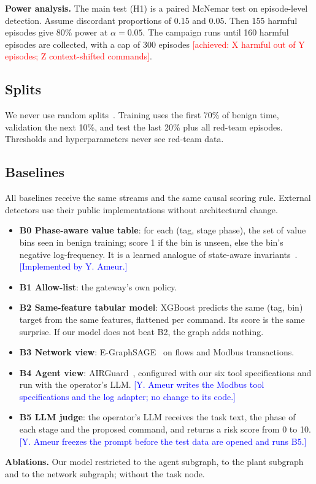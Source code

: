 \documentclass[journal]{IEEEtran}
\newcommand{\billal}[1]{\textcolor{red}{#1}}
\newcommand{\yulliwas}[1]{\textcolor{blue}{#1}}
\begin{document}
\textbf{Power analysis.} The main test (H1) is a paired McNemar test on episode-level detection. Assume discordant proportions of 0.15 and 0.05. Then 155 harmful episodes give 80\% power at $\alpha=0.05$. The campaign runs until 160 harmful episodes are collected, with a cap of 300 episodes \billal{[achieved: X harmful out of Y episodes; Z context-shifted commands]}.

\subsection{Splits}
We never use random splits~\cite{zavrak2026content}. Training uses the first 70\% of benign time, validation the next 10\%, and test the last 20\% plus all red-team episodes. Thresholds and hyperparameters never see red-team data.

\subsection{Baselines}
All baselines receive the same streams and the same causal scoring rule. External detectors use their public implementations without architectural change.
\begin{itemize}
\item \textbf{B0 Phase-aware value table}: for each (tag, stage phase), the set of value bins seen in benign training; score 1 if the bin is unseen, else the bin's negative log-frequency. It is a learned analogue of state-aware invariants~\cite{abbas2024sain}. \yulliwas{[Implemented by Y. Ameur.]}
\item \textbf{B1 Allow-list}: the gateway's own policy.
\item \textbf{B2 Same-feature tabular model}: XGBoost predicts the same (tag, bin) target from the same features, flattened per command. Its score is the same surprise. If our model does not beat B2, the graph adds nothing.
\item \textbf{B3 Network view}: E-GraphSAGE~\cite{lo2022egraphsage} on flows and Modbus transactions.
\item \textbf{B4 Agent view}: AIRGuard~\cite{qin2026airguard}, configured with our six tool specifications and run with the operator's LLM. \yulliwas{[Y. Ameur writes the Modbus tool specifications and the log adapter; no change to its code.]}
\item \textbf{B5 LLM judge}: the operator's LLM receives the task text, the phase of each stage and the proposed command, and returns a risk score from 0 to 10. \yulliwas{[Y. Ameur freezes the prompt before the test data are opened and runs B5.]}
\end{itemize}
\textbf{Ablations.} Our model restricted to the agent subgraph, to the plant subgraph and to the network subgraph; without the task node.
\end{document}
